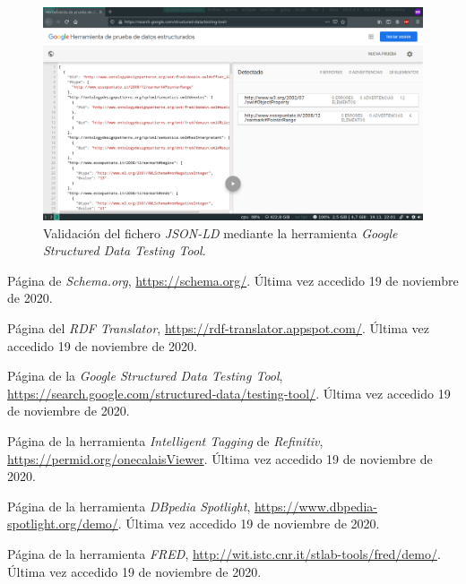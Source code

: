 \documentclass[11pt]{article}
\begin{document}
\begin{figure}[h]
\caption{Validación del fichero \textit{JSON-LD} mediante la herramienta \textit{Google Structured Data Testing Tool}.}
\centering
\includegraphics[width=\textwidth]{fred_3}
\end{figure}
\begin{thebibliography}{8}
Página de \textit{Schema.org}, \url{https://schema.org/}. Última vez accedido 19 de noviembre de 2020.        

Página del \textit{RDF Translator}, \url{https://rdf-translator.appspot.com/}. Última vez accedido 19 de noviembre de 2020.

Página de la \textit{Google Structured Data Testing Tool}, \url{https://search.google.com/structured-data/testing-tool/}. Última vez accedido 19 de noviembre de 2020.

Página de la herramienta \textit{Intelligent Tagging} de \textit{Refinitiv}, \url{https://permid.org/onecalaisViewer}. Última vez accedido 19 de noviembre de 2020.

Página de la herramienta \textit{DBpedia Spotlight}, \url{https://www.dbpedia-spotlight.org/demo/}. Última vez accedido 19 de noviembre de 2020.

Página de la herramienta \textit{FRED}, \url{http://wit.istc.cnr.it/stlab-tools/fred/demo/}. Última vez accedido 19 de noviembre de 2020.
\end{thebibliography}
\end{document}
